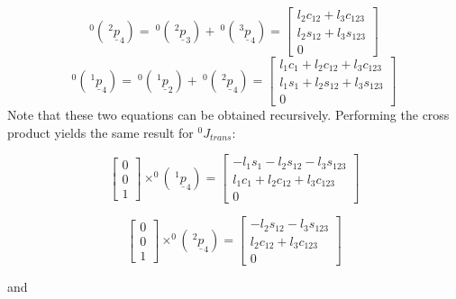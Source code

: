 \documentclass[]{article}
\begin{document}
\begin{displaymath}
^{0}(\ \!^{2}\underline{p}_{4}) = \ \!^{0}(\ \!^{2}\underline{p}_{3}) + \ \!^{0}(\ \!^{3}\underline{p}_{4}) = \left[ \begin{array}{c} l_{2}c_{12}+l_{3}c_{123} \\ l_{2}s_{12} + l_{3}s_{123} \\ 0 \end{array} \right]
\end{displaymath}
\begin{displaymath}
^{0}(\ \!^{1}\underline{p}_{4}) = \ \!^{0}(\ \!^{1}\underline{p}_{2}) + \ \!^{0}(\ \!^{2}\underline{p}_{4}) = \left[ \begin{array}{c} l_{1}c_{1}+l_{2}c_{12}+l_{3}c_{123} \\ l_{1}s_{1} + l_{2}s_{12} + l_{3}s_{123} \\ 0 \end{array} \right]
\end{displaymath}
Note that these two equations can be obtained recursively. Performing the cross product yields the same result for $^{0}J_{trans}$:

\begin{displaymath}
	\left[\begin{array}{c} 0 \\ 0 \\ 1 \end{array}\right] \times ^{0}(\ \!^{1}\underline{p}_{4}) =\left[ \begin{array}{c} -l_{1}s_{1}-l_{2}s_{12}-l_{3}s_{123} \\ l_{1}c_{1} + l_{2}c_{12} + l_{3}c_{123} \\ 0 \end{array}\right]
\end{displaymath}

\begin{displaymath}
	\left[\begin{array}{c} 0 \\ 0 \\ 1 \end{array}\right] \times ^{0}(\ \!^{2}\underline{p}_{4}) =\left[ \begin{array}{c} -l_{2}s_{12}-l_{3}s_{123} \\  l_{2}c_{12} + l_{3}c_{123} \\ 0 \end{array}\right]
\end{displaymath}

and
\end{document}
